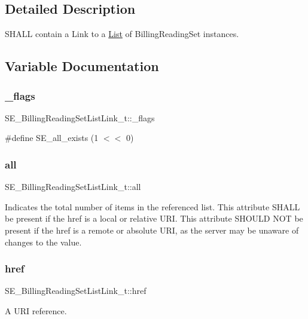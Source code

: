 \subsection{Detailed Description}
S\+H\+A\+LL contain a Link to a \hyperlink{structList}{List} of Billing\+Reading\+Set instances. 

\subsection{Variable Documentation}
\mbox{\label{group__BillingReadingSetListLink_ga7cfb529e92b421be1aa44dfcbb17909b}} 
\subsubsection{\texorpdfstring{\+\_\+flags}{\_flags}}
{\footnotesize\ttfamily S\+E\+\_\+\+Billing\+Reading\+Set\+List\+Link\+\_\+t\+::\+\_\+flags}

\#define S\+E\+\_\+all\+\_\+exists (1 $<$$<$ 0) \mbox{\label{group__BillingReadingSetListLink_ga317f96fbbbd92707b6af50aaa8fa2865}} 
\subsubsection{\texorpdfstring{all}{all}}
{\footnotesize\ttfamily S\+E\+\_\+\+Billing\+Reading\+Set\+List\+Link\+\_\+t\+::all}

Indicates the total number of items in the referenced list. This attribute S\+H\+A\+LL be present if the href is a local or relative U\+RI. This attribute S\+H\+O\+U\+LD N\+OT be present if the href is a remote or absolute U\+RI, as the server may be unaware of changes to the value. \mbox{\label{group__BillingReadingSetListLink_gabf4398b5db8e7276bafa26793d8db6bc}} 
\subsubsection{\texorpdfstring{href}{href}}
{\footnotesize\ttfamily S\+E\+\_\+\+Billing\+Reading\+Set\+List\+Link\+\_\+t\+::href}

A U\+RI reference. 